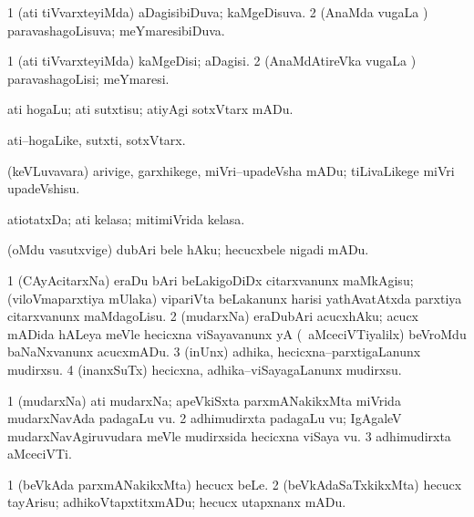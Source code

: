 \bentry
{}
\gl{\gu}
\bmng
\bnum
\num{1} (ati tiVvarxteyiMda) aDagisibiDuva; kaMgeDisuva. 
\num{2} (AnaMda \mo vugaLa \vi) paravashagoLisuva; meYmaresibiDuva. 
\enum
\emng
\eentry


\bentry
{}
\gl{\kirxvi}
\bmng
\bnum
\num{1} (ati tiVvarxteyiMda) kaMgeDisi; aDagisi. 
\num{2} (AnaMdAtireVka \mo vugaLa \vi) paravashagoLisi; meYmaresi. 
\enum
\emng
\eentry


\bentry
{}
\gl{\sakirx}
\bmng
ati hogaLu; ati sutxtisu; atiyAgi sotxVtarx mADu. 
\emng
\eentry


\bentry
{}
\gl{\nA}
\bmng
ati--hogaLike, sutxti, sotxVtarx. 
\emng
\eentry


\bentry
{}
\gl{\sakirx}
\bmng
(keVLuvavara) arivige, garxhikege, miVri--upadeVsha mADu; tiLivaLikege miVri upadeVshisu. 
\emng
\eentry


\bentry
{}
\gl{\nA}
\bmng
atiotatxDa; ati kelasa; mitimiVrida kelasa. 
\emng
\eentry


\bentry
{}
\gl{\sakirx}
\bmng
(oMdu vasutxvige) dubAri bele hAku; hecucxbele nigadi mADu. 
\emng
\eentry


\bentry
{}
\gl{\sakirx}
\bmng
\bnum
\num{1} (CAyAcitarxNa) eraDu bAri beLakigoDiDx citarxvanunx maMkAgisu; (viloVmaparxtiya mUlaka) vipariVta beLakanunx harisi yathAvatAtxda parxtiya citarxvanunx maMdagoLisu. 
\num{2} (mudarxNa) eraDubAri acucxhAku; acucx mADida hALeya meVle hecicxna viSayavanunx yA (\kanmu\ aMceciVTiyalilx) beVroMdu baNaNxvanunx acucxmADu. 
\num{3} (inUnx) adhika, hecicxna--parxtigaLanunx mudirxsu. 
\num{4} (inanxSuTx) hecicxna, adhika--viSayagaLanunx mudirxsu. 
\enum
\emng
\eentry


\bentry
{}
\gl{\nA}
\bmng
\bnum
\num{1} (mudarxNa) ati mudarxNa; apeVkiSxta parxmANakikxMta miVrida mudarxNavAda padagaLu \mo vu. 
\num{2} adhimudirxta padagaLu \mo vu; IgAgaleV mudarxNavAgiruvudara meVle mudirxsida hecicxna viSaya \mo vu. 
\num{3} adhimudirxta aMceciVTi. 
\enum
\emng
\eentry


\bentry
{}
\gl{\sakirx}
\bmng
\bnum
\num{1} (beVkAda parxmANakikxMta) hecucx beLe. 
\num{2} (beVkAdaSaTxkikxMta) hecucx tayArisu; adhikoVtapxtitxmADu; hecucx utapxnanx mADu. 
\enum
\emng
\eentry


